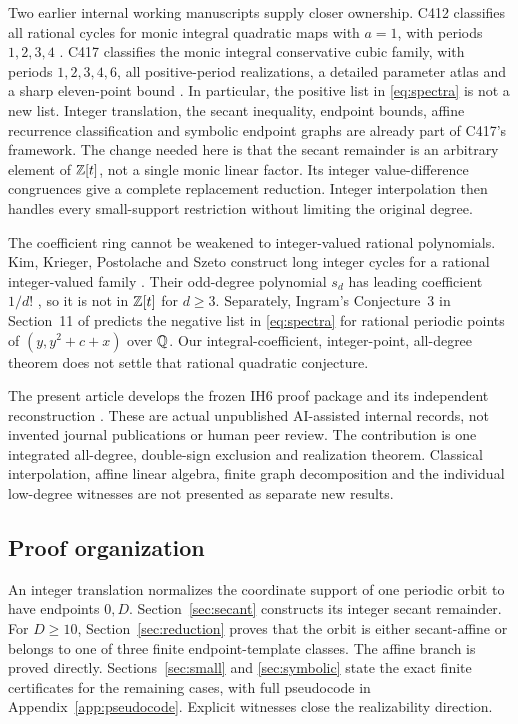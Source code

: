 Two earlier internal working manuscripts supply closer ownership.
C412 classifies all rational cycles for monic integral quadratic
maps with $a=1$, with periods $1,2,3,4$
\cite{C412Working}. C417 classifies the monic integral conservative
cubic family, with periods $1,2,3,4,6$, all positive-period
realizations, a detailed parameter atlas and a sharp eleven-point
bound \cite{C417Working}. In particular, the positive list in
\eqref{eq:spectra} is not a new list. Integer translation, the
secant inequality, endpoint bounds, affine recurrence classification
and symbolic endpoint graphs are already part of C417's framework.
The change needed here is that the secant remainder is an arbitrary
element of $\mathbb Z[t]$, not a single monic linear factor. Its integer
value-difference congruences give a complete replacement reduction.
Integer interpolation then handles every small-support restriction
without limiting the original degree.

The coefficient ring cannot be weakened to integer-valued rational
polynomials. Kim, Krieger, Postolache and Szeto construct long integer
cycles for a rational integer-valued family
\cite[Theorem~5.1]{KimEtAl2025}. Their odd-degree polynomial $s_d$
has leading coefficient $1/d!$ \cite[Section~4.1]{KimEtAl2025},
so it is not in $\mathbb Z[t]$ for $d\ge3$. Separately, Ingram's
Conjecture~3 in Section~11 of \cite{deHenon2024} predicts the
negative list in \eqref{eq:spectra} for rational periodic points
of $(y,y^2+c+x)$ over $\mathbb Q$. Our integral-coefficient, integer-point,
all-degree theorem does not settle that rational quadratic conjecture.

The present article develops the frozen IH6 proof package
\cite{IH6Working} and its independent reconstruction
\cite{IH6Review}. These are actual unpublished AI-assisted internal
records, not invented journal publications or human peer review.
The contribution is one integrated all-degree, double-sign exclusion
and realization theorem. Classical interpolation, affine linear
algebra, finite graph decomposition and the individual low-degree
witnesses are not presented as separate new results.

\subsection{Proof organization}
An integer translation normalizes the coordinate support of one
periodic orbit to have endpoints $0,D$. Section~\ref{sec:secant}
constructs its integer secant remainder. For $D\ge10$,
Section~\ref{sec:reduction} proves that the orbit is either
secant-affine or belongs to one of three finite endpoint-template classes.
The affine branch is proved directly. Sections~\ref{sec:small} and
\ref{sec:symbolic} state the exact finite certificates for the
remaining cases, with full pseudocode in Appendix~\ref{app:pseudocode}.
Explicit witnesses close the realizability direction.
